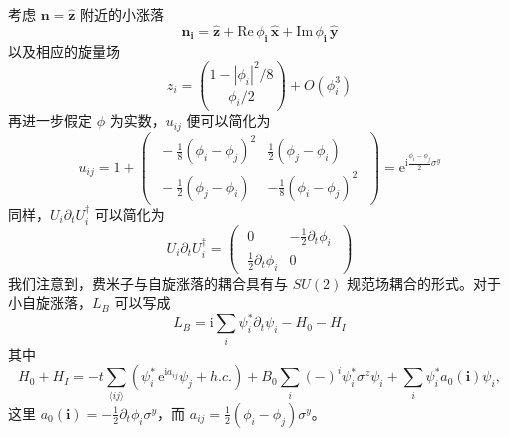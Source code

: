 考虑 $\pmb{n}=\hat{\pmb{z}}$ 附近的小涨落
\begin{equation*}
\pmb{n}_{\pmb{i}}=\hat{\pmb{z}}+\mathrm{Re}\,\phi_{\pmb{i}}\,\hat{\pmb{x}}+\mathrm{Im}\,\phi_{\pmb{i}}\,\hat{\pmb{y}} \tag{5.6.4}
\end{equation*}
以及相应的旋量场
\begin{equation*}
z_{i}=\binom{1-|\phi_{i}|^{2}/8}{\phi_{i}/2}+O(\phi^{3}_{i})
\end{equation*}
再进一步假定 $\phi$ 为实数，$u_{ij}$ 便可以简化为
\begin{equation*}
u_{ij}=1+\begin{pmatrix}\; -\frac{1}{8}(\phi_{i}-\phi_{j})^{2} & \frac{1}{2}(\phi_{j}-\phi_{i})\;\\[2pt]\; -\frac{1}{2}(\phi_{j}-\phi_{i}) & -\frac{1}{8}(\phi_{i}-\phi_{j})^{2}\; \end{pmatrix}=\mathrm{e}^{\mathrm{i}\frac{\phi_{i}-\phi_{j}}{2}\sigma^{y}}
\end{equation*}
同样，$U_{i}\partial_{t}U^{\dagger}_{i}$ 可以简化为
\begin{equation*}
U_{i}\partial_{t}U^{\dagger}_{i}=\begin{pmatrix}\; 0 & -\frac{1}{2}\partial_{t}\phi_{i}\;\\[2pt]\; \frac{1}{2}\partial_{t}\phi_{i} & 0\; \end{pmatrix}
\end{equation*}
我们注意到，费米子与自旋涨落的耦合具有与 $SU(2)$ 规范场耦合的形式。对于小自旋涨落，$L_{B}$ 可以写成
\begin{equation*}
L_{B}=\mathrm{i}\sum_{i}\psi^{*}_{i}\partial_{t}\psi_{i}-H_{0}-H_{I}
\end{equation*}
其中
\begin{equation*}
H_{0}+H_{I}=-t\sum_{\langle ij\rangle}\left(\psi^{*}_{i}\,\mathrm{e}^{\mathrm{i}a_{ij}}\psi_{j}+h.c.\right)+B_{0}\sum_{i}(-)^{i}\psi^{*}_{i}\sigma^{z}\psi_{i}+\sum_{i}\psi^{*}_{i}a_{0}(\pmb{i})\psi_{i},
\end{equation*}
这里 $a_{0}(\pmb{i})=-\frac{1}{2}\partial_{t}\phi_{i}\sigma^{y}$，而 $a_{ij}=\frac{1}{2}(\phi_{i}-\phi_{j})\sigma^{y}$。

